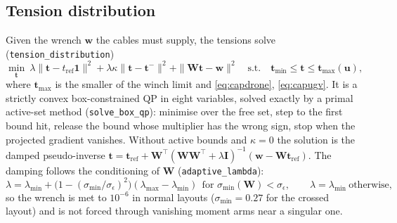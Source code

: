 \documentclass[11pt,a4paper]{article}
\newcommand{\T}{^{\!\top}}
\begin{document}
\subsection{Tension distribution}\label{sec:td}
Given the wrench $\bm w$ the cables must supply, the tensions solve (\texttt{tension\_distribution})
\begin{equation}
 \min_{\bm t}\ \lambda\|\bm t-t_{\mathrm{ref}}\bm 1\|^2+\lambda\kappa\|\bm t-\bm t^-\|^2+\|\bm W\bm t-\bm w\|^2
 \quad\text{s.t.}\quad \bm t_{\min}\le\bm t\le\bm t_{\max}(\bm u),
 \label{eq:qp}
\end{equation}
where $\bm t_{\max}$ is the smaller of the winch limit and \eqref{eq:capdrone}, \eqref{eq:capugv}. It is a strictly
convex box-constrained QP in eight variables, solved exactly by a primal active-set method
(\texttt{solve\_box\_qp}): minimise over the free set, step to the first bound hit, release the bound whose
multiplier has the wrong sign, stop when the projected gradient vanishes. Without active bounds and $\kappa=0$ the
solution is the damped pseudo-inverse $\bm t=\bm t_{\mathrm{ref}}+\bm W\T(\bm W\bm W\T+\lambda\bm I)^{-1}(\bm w-\bm W\bm t_{\mathrm{ref}})$.
The damping follows the conditioning of $\bm W$ (\texttt{adaptive\_lambda}):
\begin{equation}
 \lambda=\lambda_{\min}+\bigl(1-(\sigma_{\min}/\sigma_\epsilon)^2\bigr)(\lambda_{\max}-\lambda_{\min})\ \ \text{for }\sigma_{\min}(\bm W)<\sigma_\epsilon,\qquad\lambda=\lambda_{\min}\ \text{otherwise,}
\end{equation}
so the wrench is met to $10^{-6}$ in normal layouts ($\sigma_{\min}=0.27$ for the crossed layout) and is not
forced through vanishing moment arms near a singular one.
\end{document}
